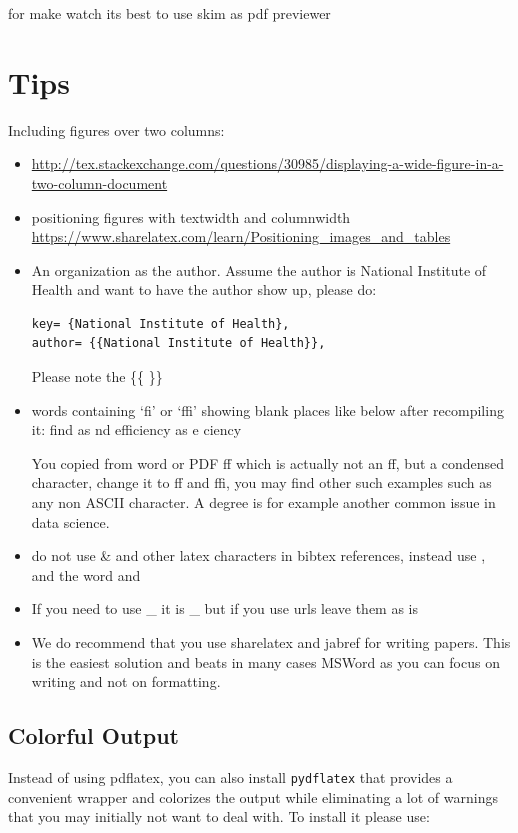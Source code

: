 for make watch its best to use skim as pdf previewer


\section{Tips}\label{tips}

Including figures over two columns:

\begin{itemize}
\item
  \url{http://tex.stackexchange.com/questions/30985/displaying-a-wide-figure-in-a-two-column-document}
\item
  positioning figures with textwidth and columnwidth
  \url{https://www.sharelatex.com/learn/Positioning_images_and_tables}
\item
  An organization as the author. Assume the author is National Institute
  of Health and want to have the author show up, please do:

\begin{verbatim}
key= {National Institute of Health},
author= {{National Institute of Health}},
\end{verbatim}

  Please note the \{\{ \}\}
\item
  words containing `fi' or `ffi' showing blank places like below after
  recompiling it: find as nd efficiency as e ciency

  You copied from word or PDF ff which is actually not an ff, but a
  condensed character, change it to ff and ffi, you may find other such
  examples such as any non ASCII character. A degree is for example
  another common issue in data science.
\item
  do not use \textbar{} \& and other latex characters in bibtex
  references, instead use , and the word and
\item
  If you need to use \_ it is \_ but if you use urls leave them as is
\item
  We do recommend that you use sharelatex and jabref for writing papers.
  This is the easiest solution and beats in many cases MSWord as you can
  focus on writing and not on formatting.
\end{itemize}

\subsection{Colorful Output}

Instead of using pdflatex, you can also install \verb|pydflatex| that
provides a convenient wrapper and colorizes the output while
eliminating a lot of warnings that you may initially not want to deal
with. To install it please use:

